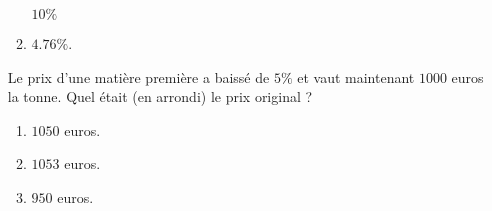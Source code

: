 \begin{exercice}
\begin{enumerate}
\begin{enumerate}
                \( 10\%\)
            \item
                \( 4.76\%\).
        \end{enumerate}
        Le prix d'une matière première a baissé de \( 5\%\) et vaut maintenant \( 1000\) euros la tonne. Quel était (en arrondi) le prix original ?
        \begin{enumerate}
            \item
                \( 1050\) euros.
            \item
                \( 1053\) euros.
            \item
                \( 950\) euros.
        \end{enumerate}
    \end{enumerate}
        
\end{exercice}
